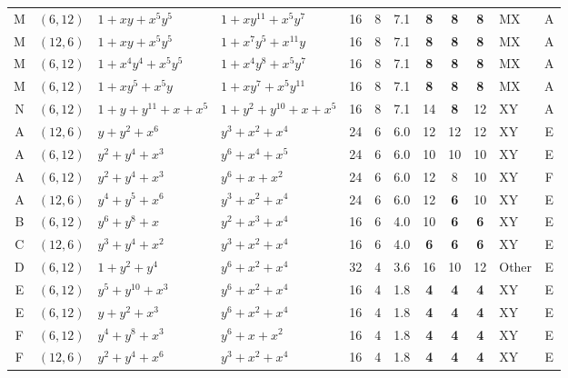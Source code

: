 \begin{table}[t]
\begin{tabular*}{\textwidth}{@{\extracolsep{\fill}}clllcccccclc}
M & $(6,12)$ & $1{+}xy{+}x^{5}y^{5}$ & $1{+}xy^{11}{+}x^{5}y^{7}$ & 16 & 8 & 7.1 & \textbf{8} & \textbf{8} & \textbf{8} & MX & A \\
M & $(12,6)$ & $1{+}xy{+}x^{5}y^{5}$ & $1{+}x^{7}y^{5}{+}x^{11}y$ & 16 & 8 & 7.1 & \textbf{8} & \textbf{8} & \textbf{8} & MX & A \\
M & $(6,12)$ & $1{+}x^{4}y^{4}{+}x^{5}y^{5}$ & $1{+}x^{4}y^{8}{+}x^{5}y^{7}$ & 16 & 8 & 7.1 & \textbf{8} & \textbf{8} & \textbf{8} & MX & A \\
M & $(6,12)$ & $1{+}xy^{5}{+}x^{5}y$ & $1{+}xy^{7}{+}x^{5}y^{11}$ & 16 & 8 & 7.1 & \textbf{8} & \textbf{8} & \textbf{8} & MX & A \\
N & $(6,12)$ & $1{+}y{+}y^{11}{+}x{+}x^{5}$ & $1{+}y^{2}{+}y^{10}{+}x{+}x^{5}$ & 16 & 8 & 7.1 & 14 & \textbf{8} & 12 & XY & A \\
A & $(12,6)$ & $y{+}y^{2}{+}x^{6}$ & $y^{3}{+}x^{2}{+}x^{4}$ & 24 & 6 & 6.0 & 12 & 12 & 12 & XY & E \\
A & $(6,12)$ & $y^{2}{+}y^{4}{+}x^{3}$ & $y^{6}{+}x^{4}{+}x^{5}$ & 24 & 6 & 6.0 & 10 & 10 & 10 & XY & E \\
A & $(6,12)$ & $y^{2}{+}y^{4}{+}x^{3}$ & $y^{6}{+}x{+}x^{2}$ & 24 & 6 & 6.0 & 12 & 8 & 10 & XY & F \\
A & $(12,6)$ & $y^{4}{+}y^{5}{+}x^{6}$ & $y^{3}{+}x^{2}{+}x^{4}$ & 24 & 6 & 6.0 & 12 & \textbf{6} & 10 & XY & E \\
B & $(6,12)$ & $y^{6}{+}y^{8}{+}x$ & $y^{2}{+}x^{3}{+}x^{4}$ & 16 & 6 & 4.0 & 10 & \textbf{6} & \textbf{6} & XY & E \\
C & $(12,6)$ & $y^{3}{+}y^{4}{+}x^{2}$ & $y^{3}{+}x^{2}{+}x^{4}$ & 16 & 6 & 4.0 & \textbf{6} & \textbf{6} & \textbf{6} & XY & E \\
D & $(6,12)$ & $1{+}y^{2}{+}y^{4}$ & $y^{6}{+}x^{2}{+}x^{4}$ & 32 & 4 & 3.6 & 16 & 10 & 12 & Other & E \\
E & $(6,12)$ & $y^{5}{+}y^{10}{+}x^{3}$ & $y^{6}{+}x^{2}{+}x^{4}$ & 16 & 4 & 1.8 & \textbf{4} & \textbf{4} & \textbf{4} & XY & E \\
E & $(6,12)$ & $y{+}y^{2}{+}x^{3}$ & $y^{6}{+}x^{2}{+}x^{4}$ & 16 & 4 & 1.8 & \textbf{4} & \textbf{4} & \textbf{4} & XY & E \\
F & $(6,12)$ & $y^{4}{+}y^{8}{+}x^{3}$ & $y^{6}{+}x{+}x^{2}$ & 16 & 4 & 1.8 & \textbf{4} & \textbf{4} & \textbf{4} & XY & E \\
F & $(12,6)$ & $y^{2}{+}y^{4}{+}x^{6}$ & $y^{3}{+}x^{2}{+}x^{4}$ & 16 & 4 & 1.8 & \textbf{4} & \textbf{4} & \textbf{4} & XY & E \\

\end{tabular*}
\end{table}
